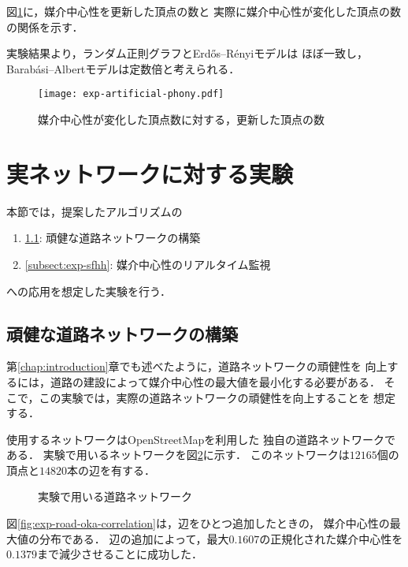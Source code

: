 図\ref{fig:exp-artificial-phony}に，媒介中心性を更新した頂点の数と
実際に媒介中心性が変化した頂点の数の関係を示す．

実験結果より，ランダム正則グラフとErd\H{o}s--R\'{e}nyiモデルは
ほぼ一致し，Barab\'{a}si--Albertモデルは定数倍と考えられる．

\begin{figure}[tb]
  \centering
  \texttt{[image: exp-artificial-phony.pdf]}
  \caption{媒介中心性が変化した頂点数に対する，更新した頂点の数}
  \label{fig:exp-artificial-phony}
\end{figure}

\section{実ネットワークに対する実験}
\label{sect:exp-realnet}

本節では，提案したアルゴリズムの
\begin{enumerate}
\item[]\ref{subsect:exp-road}: 頑健な道路ネットワークの構築
\item[]\ref{subsect:exp-sfhh}: 媒介中心性のリアルタイム監視
\end{enumerate}
への応用を想定した実験を行う．

\subsection{頑健な道路ネットワークの構築}
\label{subsect:exp-road}

第\ref{chap:introduction}章でも述べたように，道路ネットワークの頑健性を
向上するには，道路の建設によって媒介中心性の最大値を最小化する必要がある．
そこで，この実験では，実際の道路ネットワークの頑健性を向上することを
想定する．

使用するネットワークはOpenStreetMap\cite{OpenStreetMap}を利用した
独自の道路ネットワークである．
実験で用いるネットワークを図\ref{fig:road-okayama}に示す．
このネットワークは$12165$個の頂点と$14820$本の辺を有する．
\begin{figure}[tb]
  \centering
  \caption{実験で用いる道路ネットワーク}
  \label{fig:road-okayama}
\end{figure}

図\ref{fig:exp-road-oka-correlation}は，辺をひとつ追加したときの，
媒介中心性の最大値の分布である．
辺の追加によって，最大$0.1607$の正規化された媒介中心性を
$0.1379$まで減少させることに成功した．

